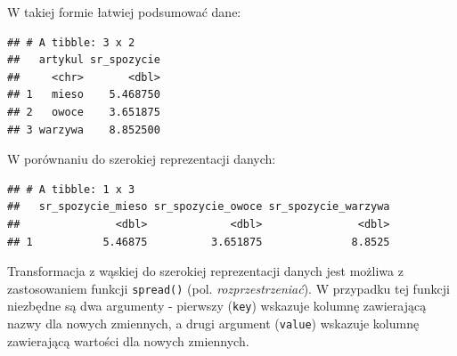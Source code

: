 \documentclass[]{book}
\newenvironment{Shaded}{\begin{snugshade}}{\end{snugshade}}
\newcommand{\KeywordTok}[1]{\textcolor[rgb]{0.13,0.29,0.53}{\textbf{#1}}}
\newcommand{\DataTypeTok}[1]{\textcolor[rgb]{0.13,0.29,0.53}{#1}}
\newcommand{\StringTok}[1]{\textcolor[rgb]{0.31,0.60,0.02}{#1}}
\newcommand{\OperatorTok}[1]{\textcolor[rgb]{0.81,0.36,0.00}{\textbf{#1}}}
\newcommand{\NormalTok}[1]{#1}
\begin{document}
W takiej formie łatwiej podsumować dane:

\begin{Shaded}
\end{Shaded}

\begin{verbatim}
## # A tibble: 3 x 2
##   artykul sr_spozycie
##     <chr>       <dbl>
## 1   mieso    5.468750
## 2   owoce    3.651875
## 3 warzywa    8.852500
\end{verbatim}

W porównaniu do szerokiej reprezentacji danych:

\begin{Shaded}
\end{Shaded}

\begin{verbatim}
## # A tibble: 1 x 3
##   sr_spozycie_mieso sr_spozycie_owoce sr_spozycie_warzywa
##               <dbl>             <dbl>               <dbl>
## 1           5.46875          3.651875              8.8525
\end{verbatim}

Transformacja z wąskiej do szerokiej reprezentacji danych jest możliwa z
zastosowaniem funkcji \texttt{spread()} (pol. \emph{rozprzestrzeniać}).
W przypadku tej funkcji niezbędne są dwa argumenty - pierwszy
(\texttt{key}) wskazuje kolumnę zawierającą nazwy dla nowych zmiennych,
a drugi argument (\texttt{value}) wskazuje kolumnę zawierającą wartości
dla nowych zmiennych.

\begin{Shaded}
\end{Shaded}
\end{document}
